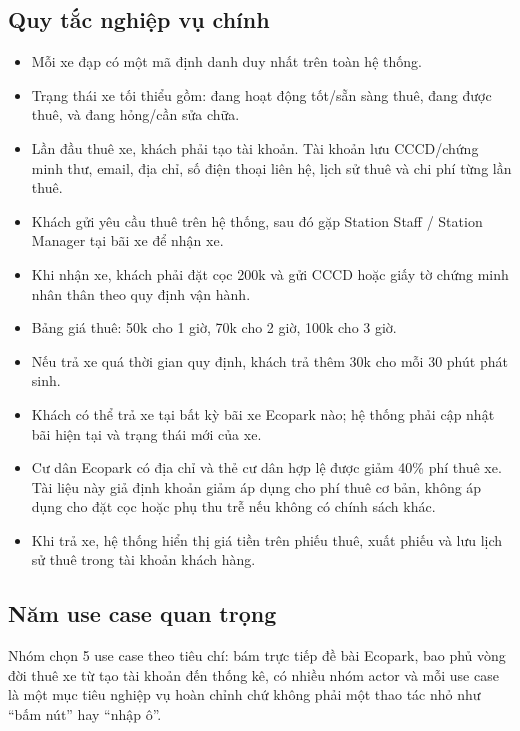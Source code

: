 \subsection{Quy tắc nghiệp vụ chính}
\begin{itemize}
  \item Mỗi xe đạp có một mã định danh duy nhất trên toàn hệ thống.
  \item Trạng thái xe tối thiểu gồm: đang hoạt động tốt/sẵn sàng thuê, đang được thuê, và đang hỏng/cần sửa chữa.
  \item Lần đầu thuê xe, khách phải tạo tài khoản. Tài khoản lưu CCCD/chứng minh thư, email, địa chỉ, số điện thoại liên hệ, lịch sử thuê và chi phí từng lần thuê.
  \item Khách gửi yêu cầu thuê trên hệ thống, sau đó gặp Station Staff / Station Manager tại bãi xe để nhận xe.
  \item Khi nhận xe, khách phải đặt cọc 200k và gửi CCCD hoặc giấy tờ chứng minh nhân thân theo quy định vận hành.
  \item Bảng giá thuê: 50k cho 1 giờ, 70k cho 2 giờ, 100k cho 3 giờ.
  \item Nếu trả xe quá thời gian quy định, khách trả thêm 30k cho mỗi 30 phút phát sinh.
  \item Khách có thể trả xe tại bất kỳ bãi xe Ecopark nào; hệ thống phải cập nhật bãi hiện tại và trạng thái mới của xe.
  \item Cư dân Ecopark có địa chỉ và thẻ cư dân hợp lệ được giảm 40\% phí thuê xe. Tài liệu này giả định khoản giảm áp dụng cho phí thuê cơ bản, không áp dụng cho đặt cọc hoặc phụ thu trễ nếu không có chính sách khác.
  \item Khi trả xe, hệ thống hiển thị giá tiền trên phiếu thuê, xuất phiếu và lưu lịch sử thuê trong tài khoản khách hàng.
\end{itemize}

\subsection{Năm use case quan trọng}
Nhóm chọn 5 use case theo tiêu chí: bám trực tiếp đề bài Ecopark, bao phủ vòng đời
thuê xe từ tạo tài khoản đến thống kê, có nhiều nhóm actor và mỗi use case là một
mục tiêu nghiệp vụ hoàn chỉnh chứ không phải một thao tác nhỏ như ``bấm nút'' hay
``nhập ô''.


